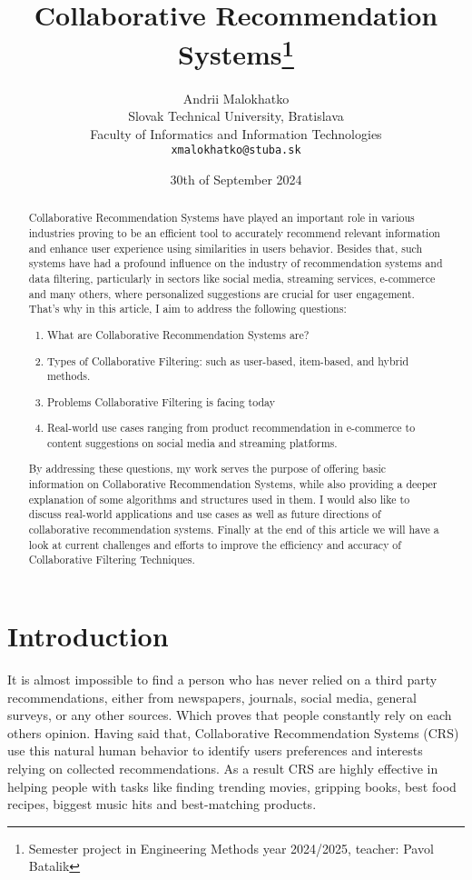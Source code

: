 \documentclass[10pt,a4paper]{article}
\title{Collaborative Recommendation Systems\thanks{Semester project in Engineering Methods year 2024/2025, teacher: Pavol Batalik}}
\author{Andrii Malokhatko\\[2pt]
	{\small Slovak Technical University, Bratislava}\\
	{\small Faculty of Informatics and Information Technologies}\\
	{\small \texttt{xmalokhatko@stuba.sk}}
	}
\date{\small 30th of September 2024}
\begin{document}
\maketitle

\begin{abstract}

Collaborative Recommendation Systems have played an important role in various industries proving to be an efficient tool to accurately recommend relevant information and enhance user experience using similarities in users behavior. Besides that, such systems have had a profound influence on the industry of recommendation systems and data filtering, particularly in sectors like social media, streaming services,  e-commerce and many others, where personalized suggestions are crucial for user engagement. That's why in this article, I aim to address the following questions:
\begin{enumerate}
\item What are Collaborative Recommendation Systems are?
\item Types of Collaborative Filtering: such as user-based, item-based, and hybrid methods.
\item Problems Collaborative Filtering is facing today  
\item Real-world use cases ranging from product recommendation in e-commerce to content suggestions on social media and streaming platforms.
\end{enumerate}

By addressing these questions, my work serves the purpose of offering basic information on Collaborative Recommendation Systems, while also providing a deeper explanation of some algorithms and structures used in them. I would also like to discuss real-world applications and use cases as well as future directions of collaborative recommendation systems. Finally at the end of this article we will have a look at current challenges and efforts to improve the efficiency and accuracy of Collaborative Filtering Techniques.
\clearpage
\end{abstract}



\section{Introduction}

It is almost impossible to find a person who has never relied on a third party recommendations, either from newspapers, journals, social media, general surveys, or any other sources.  Which proves that people constantly rely on each others opinion. Having said that, Collaborative Recommendation Systems (CRS) use this natural human behavior to identify  users preferences and interests relying on collected recommendations. As a result CRS are highly effective in helping people with tasks like finding trending movies, gripping books, best food recipes, biggest music hits and best-matching products.\cite{10.1155/2009/421425}
\end{document}
